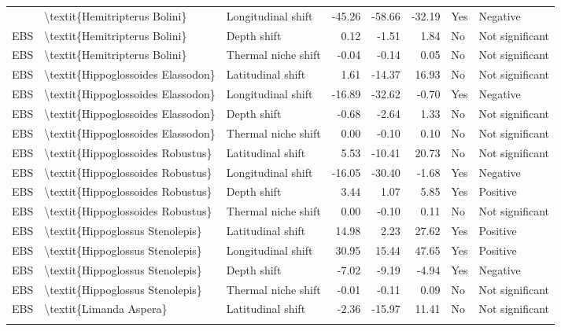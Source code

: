 \begin{longtable}[t]{lllrrrll}
{{EBS & \textbackslash{}textit\{Hemitripterus Bolini\} & Longitudinal shift & -45.26 & -58.66 & -32.19 & Yes & Negative\\
EBS & \textbackslash{}textit\{Hemitripterus Bolini\} & Depth shift & 0.12 & -1.51 & 1.84 & No & Not significant\\
\addlinespace
EBS & \textbackslash{}textit\{Hemitripterus Bolini\} & Thermal niche shift & -0.04 & -0.14 & 0.05 & No & Not significant\\
EBS & \textbackslash{}textit\{Hippoglossoides Elassodon\} & Latitudinal shift & 1.61 & -14.37 & 16.93 & No & Not significant\\
EBS & \textbackslash{}textit\{Hippoglossoides Elassodon\} & Longitudinal shift & -16.89 & -32.62 & -0.70 & Yes & Negative\\
EBS & \textbackslash{}textit\{Hippoglossoides Elassodon\} & Depth shift & -0.68 & -2.64 & 1.33 & No & Not significant\\
EBS & \textbackslash{}textit\{Hippoglossoides Elassodon\} & Thermal niche shift & 0.00 & -0.10 & 0.10 & No & Not significant\\
\addlinespace
EBS & \textbackslash{}textit\{Hippoglossoides Robustus\} & Latitudinal shift & 5.53 & -10.41 & 20.73 & No & Not significant\\
EBS & \textbackslash{}textit\{Hippoglossoides Robustus\} & Longitudinal shift & -16.05 & -30.40 & -1.68 & Yes & Negative\\
EBS & \textbackslash{}textit\{Hippoglossoides Robustus\} & Depth shift & 3.44 & 1.07 & 5.85 & Yes & Positive\\
EBS & \textbackslash{}textit\{Hippoglossoides Robustus\} & Thermal niche shift & 0.00 & -0.10 & 0.11 & No & Not significant\\
EBS & \textbackslash{}textit\{Hippoglossus Stenolepis\} & Latitudinal shift & 14.98 & 2.23 & 27.62 & Yes & Positive\\
\addlinespace
EBS & \textbackslash{}textit\{Hippoglossus Stenolepis\} & Longitudinal shift & 30.95 & 15.44 & 47.65 & Yes & Positive\\
EBS & \textbackslash{}textit\{Hippoglossus Stenolepis\} & Depth shift & -7.02 & -9.19 & -4.94 & Yes & Negative\\
EBS & \textbackslash{}textit\{Hippoglossus Stenolepis\} & Thermal niche shift & -0.01 & -0.11 & 0.09 & No & Not significant\\
EBS & \textbackslash{}textit\{Limanda Aspera\} & Latitudinal shift & -2.36 & -15.97 & 11.41 & No & Not significant\\
}}
\end{longtable}

